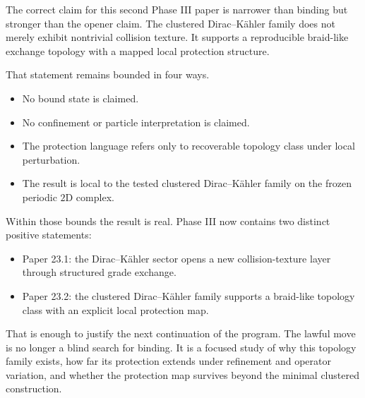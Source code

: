 \documentclass[11pt]{article}
\begin{document}
The correct claim for this second Phase III paper is narrower than binding but stronger than the opener claim. The clustered Dirac--K\"ahler family does not merely exhibit nontrivial collision texture. It supports a reproducible braid-like exchange topology with a mapped local protection structure.

That statement remains bounded in four ways.
\begin{itemize}
\item No bound state is claimed.
\item No confinement or particle interpretation is claimed.
\item The protection language refers only to recoverable topology class under local perturbation.
\item The result is local to the tested clustered Dirac--K\"ahler family on the frozen periodic $2$D complex.
\end{itemize}

Within those bounds the result is real. Phase III now contains two distinct positive statements:
\begin{itemize}
\item Paper 23.1: the Dirac--K\"ahler sector opens a new collision-texture layer through structured grade exchange.
\item Paper 23.2: the clustered Dirac--K\"ahler family supports a braid-like topology class with an explicit local protection map.
\end{itemize}

That is enough to justify the next continuation of the program. The lawful move is no longer a blind search for binding. It is a focused study of why this topology family exists, how far its protection extends under refinement and operator variation, and whether the protection map survives beyond the minimal clustered construction.
\end{document}
